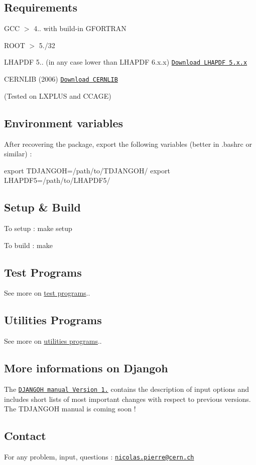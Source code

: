 \subsection*{Requirements}

G\+CC $>$ 4.. with build-\/in G\+F\+O\+R\+T\+R\+AN

R\+O\+OT $>$ 5./32

L\+H\+A\+P\+DF 5.. (in any case lower than L\+H\+A\+P\+DF 6.\+x.\+x) \href{https://www.hepforge.org/downloads/lhapdf}{\tt Download L\+H\+A\+P\+DF 5.\+x.\+x}

C\+E\+R\+N\+L\+IB (2006) \href{http://cernlib.web.cern.ch/cernlib/version.html}{\tt Download C\+E\+R\+N\+L\+IB}

(Tested on L\+X\+P\+L\+US and C\+C\+A\+GE)

\subsection*{Environment variables}

After recovering the package, export the following variables (better in .bashrc or similar) \+:

{\ttfamily export T\+D\+J\+A\+N\+G\+OH=/path/to/\+T\+D\+J\+A\+N\+G\+O\+H/} {\ttfamily export L\+H\+A\+P\+D\+F5=/path/to/\+L\+H\+A\+P\+D\+F5/}

\subsection*{Setup \& Build}

To setup \+: {\ttfamily make setup}

To build \+: {\ttfamily make}

\subsection*{Test Programs}

See more on \hyperlink{md_test__t_e_s_t_p_r_o_g_r_a_m_s}{test programs}..

\subsection*{Utilities Programs}

See more on \hyperlink{md_utils__u_t_i_l_s_p_r_o_g_r_a_m_s}{utilities programs}..

\subsection*{More informations on Djangoh}

The \href{http://wwwthep.physik.uni-mainz.de/~hspiesb/djangoh/djangoh_m.4.6.6.ps.gz}{\tt D\+J\+A\+N\+G\+OH manual Version 1.} contains the description of input options and includes short lists of most important changes with respect to previous versions. The T\+D\+J\+A\+N\+G\+OH manual is coming soon !

\subsection*{Contact}

For any problem, input, questions \+: \href{mailto:nicolas.pierre@cern.ch}{\tt nicolas.\+pierre@cern.\+ch} 